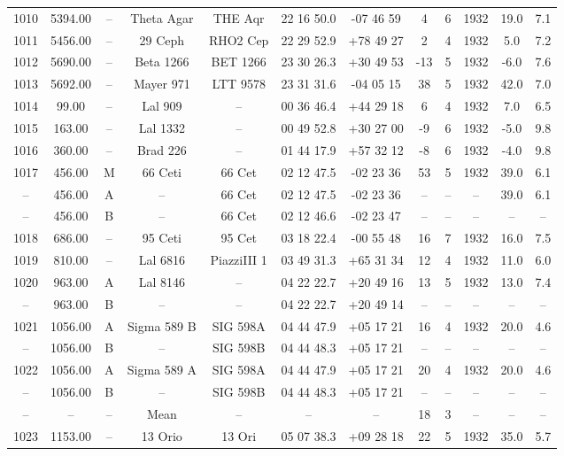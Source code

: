 \begin{table}
\begin{tabular}{cccccccccccc}
1010 & 5394.00 & -- & Theta Agar & THE Aqr & 22 16 50.0 & -07 46 59 & 4 & 6 & 1932 & 19.0 & 7.1 \\
1011 & 5456.00 & -- & 29 Ceph & RHO2 Cep & 22 29 52.9 & +78 49 27 & 2 & 4 & 1932 & 5.0 & 7.2 \\
1012 & 5690.00 & -- & Beta 1266 & BET 1266 & 23 30 26.3 & +30 49 53 & -13 & 5 & 1932 & -6.0 & 7.6 \\
1013 & 5692.00 & -- & Mayer 971 & LTT 9578 & 23 31 31.6 & -04 05 15 & 38 & 5 & 1932 & 42.0 & 7.0 \\
1014 & 99.00 & -- & Lal 909 & -- & 00 36 46.4 & +44 29 18 & 6 & 4 & 1932 & 7.0 & 6.5 \\
1015 & 163.00 & -- & Lal 1332 & -- & 00 49 52.8 & +30 27 00 & -9 & 6 & 1932 & -5.0 & 9.8 \\
1016 & 360.00 & -- & Brad 226 & -- & 01 44 17.9 & +57 32 12 & -8 & 6 & 1932 & -4.0 & 9.8 \\
1017 & 456.00 & M & 66 Ceti & 66 Cet & 02 12 47.5 & -02 23 36 & 53 & 5 & 1932 & 39.0 & 6.1 \\
-- & 456.00 & A & -- & 66 Cet & 02 12 47.5 & -02 23 36 & -- & -- & -- & 39.0 & 6.1 \\
-- & 456.00 & B & -- & 66 Cet & 02 12 46.6 & -02 23 47 & -- & -- & -- & -- & -- \\
1018 & 686.00 & -- & 95 Ceti & 95 Cet & 03 18 22.4 & -00 55 48 & 16 & 7 & 1932 & 16.0 & 7.5 \\
1019 & 810.00 & -- & Lal 6816 & PiazziIII 1 & 03 49 31.3 & +65 31 34 & 12 & 4 & 1932 & 11.0 & 6.0 \\
1020 & 963.00 & A & Lal 8146 & -- & 04 22 22.7 & +20 49 16 & 13 & 5 & 1932 & 13.0 & 7.4 \\
-- & 963.00 & B & -- & -- & 04 22 22.7 & +20 49 14 & -- & -- & -- & -- & -- \\
1021 & 1056.00 & A & Sigma 589 B & SIG 598A & 04 44 47.9 & +05 17 21 & 16 & 4 & 1932 & 20.0 & 4.6 \\
-- & 1056.00 & B & -- & SIG 598B & 04 44 48.3 & +05 17 21 & -- & -- & -- & -- & -- \\
1022 & 1056.00 & A & Sigma 589 A & SIG 598A & 04 44 47.9 & +05 17 21 & 20 & 4 & 1932 & 20.0 & 4.6 \\
-- & 1056.00 & B & -- & SIG 598B & 04 44 48.3 & +05 17 21 & -- & -- & -- & -- & -- \\
-- & -- & -- & Mean & -- & -- & -- & 18 & 3 & -- & -- & -- \\
1023 & 1153.00 & -- & 13 Orio & 13 Ori & 05 07 38.3 & +09 28 18 & 22 & 5 & 1932 & 35.0 & 5.7 \\

\end{tabular}
\end{table}
